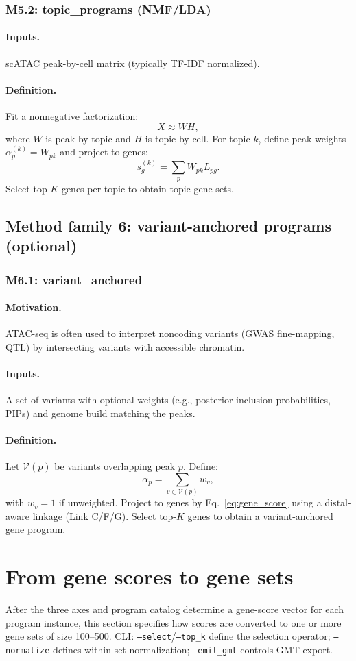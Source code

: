 \documentclass[11pt]{article}
\begin{document}
\subsubsection{M5.2: topic\_programs (NMF/LDA)}
\paragraph{Inputs.} scATAC peak-by-cell matrix (typically TF-IDF normalized).
\paragraph{Definition.} Fit a nonnegative factorization:
\[
X \approx W H,
\]
where $W$ is peak-by-topic and $H$ is topic-by-cell.
For topic $k$, define peak weights $\alpha_p^{(k)} = W_{pk}$ and project to genes:
\[
s_g^{(k)} = \sum_p W_{pk} L_{pg}.
\]
Select top-$K$ genes per topic to obtain topic gene sets.

\subsection{Method family 6: variant-anchored programs (optional)}
\subsubsection{M6.1: variant\_anchored}
\paragraph{Motivation.} ATAC-seq is often used to interpret noncoding variants (GWAS fine-mapping, QTL) by intersecting variants with accessible chromatin.
\paragraph{Inputs.} A set of variants with optional weights (e.g., posterior inclusion probabilities, PIPs) and genome build matching the peaks.
\paragraph{Definition.} Let $\mathcal{V}(p)$ be variants overlapping peak $p$. Define:
\[
\alpha_p = \sum_{v \in \mathcal{V}(p)} w_v,
\]
with $w_v=1$ if unweighted.
Project to genes by Eq.\ \ref{eq:gene_score} using a distal-aware linkage (Link C/F/G). Select top-$K$ genes to obtain a variant-anchored gene program.

\section{From gene scores to gene sets}
\label{sec:set_extraction}
After the three axes and program catalog determine a gene-score vector for each program instance, this section specifies how scores are converted to one or more gene sets of size 100--500.
CLI: \texttt{--select}/\texttt{--top\_k} define the selection operator; \texttt{--normalize} defines within-set normalization; \texttt{--emit\_gmt} controls GMT export.
\end{document}
